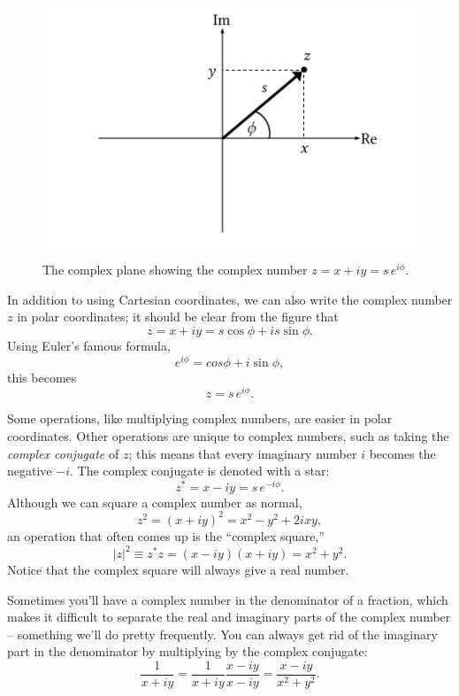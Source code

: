 \begin{figure}
\centering\includegraphics[width=0.7\linewidth]{Figures/Chapter4/fig_complex_plane}
\caption{The complex plane showing the complex number $z = x + iy = s \, e^{i\phi}$.}
\label{fig_complex_plane}
\end{figure}

In addition to using Cartesian coordinates, we can also write the complex number $z$ in polar coordinates; it should be clear from the figure that
\[
z = x + iy = s \cos \phi + is \sin \phi.
\]
Using Euler's famous formula,
\[
e^{i \phi} = cos \phi + i \sin \phi,
\]
this becomes
\begin{equation}
z = s \, e^{i \phi}.
\end{equation}

Some operations, like multiplying complex numbers, are easier in polar coordinates.  Other operations are unique to complex numbers, such as taking the \emph{complex conjugate} of $z$; this means that every imaginary number $i$ becomes the negative $-i$.  The complex conjugate is denoted with a star:
\[
z^* = x - iy = s \, e^{-i\phi}.
\] 
Although we can square a complex number as normal,
\begin{equation}
\label{eq_z_squared}
z^2 = (x + iy)^2 = x^2 - y^2 + 2ixy,
\end{equation}
an operation that often comes up is the ``complex square,''
\begin{equation}
|z|^2 \equiv z^* z = (x-iy)(x+iy) = x^2 + y^2.
\end{equation}
Notice that the complex square will always give a real number.

Sometimes you'll have a complex number in the denominator of a fraction, which makes it difficult to separate the real and imaginary parts of the complex number -- something we'll do pretty frequently.  You can always get rid of the imaginary part in the denominator by multiplying by the complex conjugate:
\[
\frac{1}{x + iy} = \frac{1}{x+iy} \frac{x - iy}{x-iy} = \frac{x - iy}{x^2 + y^2}.
\]

